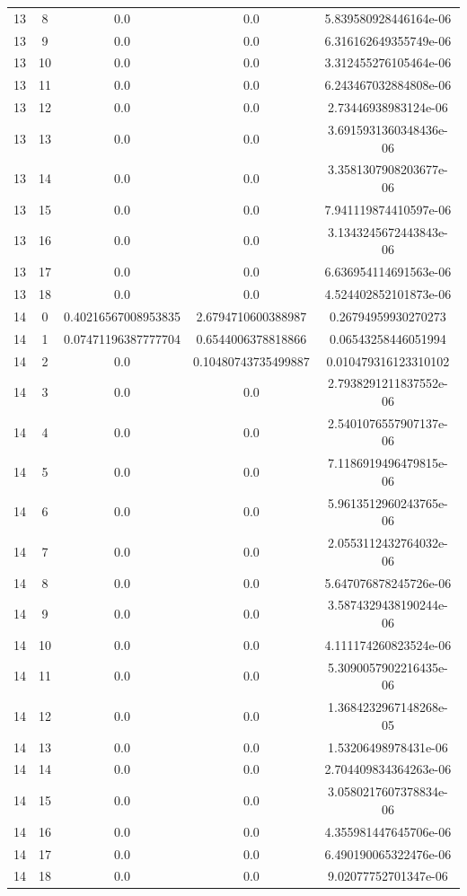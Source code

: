\documentclass{article}
\begin{document}
\begin{table}[h]
\begin{tabular}{|c|c|c|c|c|}
13 & 8 & 0.0 & 0.0 & 5.839580928446164e-06 \\
13 & 9 & 0.0 & 0.0 & 6.316162649355749e-06 \\
13 & 10 & 0.0 & 0.0 & 3.312455276105464e-06 \\
13 & 11 & 0.0 & 0.0 & 6.243467032884808e-06 \\
13 & 12 & 0.0 & 0.0 & 2.73446938983124e-06 \\
13 & 13 & 0.0 & 0.0 & 3.6915931360348436e-06 \\
13 & 14 & 0.0 & 0.0 & 3.3581307908203677e-06 \\
13 & 15 & 0.0 & 0.0 & 7.941119874410597e-06 \\
13 & 16 & 0.0 & 0.0 & 3.1343245672443843e-06 \\
13 & 17 & 0.0 & 0.0 & 6.636954114691563e-06 \\
13 & 18 & 0.0 & 0.0 & 4.524402852101873e-06 \\
14 & 0 & 0.40216567008953835 & 2.6794710600388987 & 0.26794959930270273 \\
14 & 1 & 0.07471196387777704 & 0.6544006378818866 & 0.06543258446051994 \\
14 & 2 & 0.0 & 0.10480743735499887 & 0.010479316123310102 \\
14 & 3 & 0.0 & 0.0 & 2.7938291211837552e-06 \\
14 & 4 & 0.0 & 0.0 & 2.5401076557907137e-06 \\
14 & 5 & 0.0 & 0.0 & 7.1186919496479815e-06 \\
14 & 6 & 0.0 & 0.0 & 5.9613512960243765e-06 \\
14 & 7 & 0.0 & 0.0 & 2.0553112432764032e-06 \\
14 & 8 & 0.0 & 0.0 & 5.647076878245726e-06 \\
14 & 9 & 0.0 & 0.0 & 3.5874329438190244e-06 \\
14 & 10 & 0.0 & 0.0 & 4.111174260823524e-06 \\
14 & 11 & 0.0 & 0.0 & 5.3090057902216435e-06 \\
14 & 12 & 0.0 & 0.0 & 1.3684232967148268e-05 \\
14 & 13 & 0.0 & 0.0 & 1.53206498978431e-06 \\
14 & 14 & 0.0 & 0.0 & 2.704409834364263e-06 \\
14 & 15 & 0.0 & 0.0 & 3.0580217607378834e-06 \\
14 & 16 & 0.0 & 0.0 & 4.355981447645706e-06 \\
14 & 17 & 0.0 & 0.0 & 6.490190065322476e-06 \\
14 & 18 & 0.0 & 0.0 & 9.02077752701347e-06 \\

\end{tabular}
\end{table}
\end{document}
